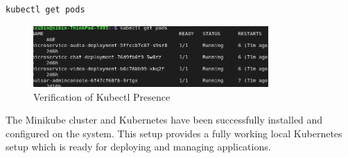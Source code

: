 \begin{lstlisting}[breaklines=true,basicstyle=\small\ttfamily,frame=single]
kubectl get pods
\end{lstlisting}

\begin{figure}[h!]
    \centering
    \includegraphics[width=0.8\textwidth]{implementation/pods.png}
    \caption{Verification of Kubectl Presence}
    \label{fig:kgetpods}
\end{figure}

The Minikube cluster and Kubernetes have been successfully installed and configured on the system. This setup provides a fully working local Kubernetes setup which is ready for deploying and managing applications.








